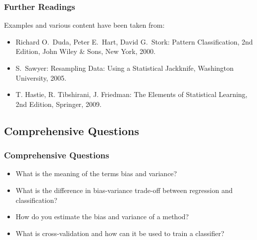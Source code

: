 \begin{frame}
  \frametitle{Further Readings}
  
  Examples and various content have been taken from: \\[.3cm]
  
  \begin{itemize}
    \item Richard O.\ Duda, Peter E.\ Hart, David G.\ Stork: Pattern Classification, 2nd Edition, John Wiley \& Sons, New York, 2000. \\[.3cm]
    \item S.\ Sawyer: Resampling Data: Using a Statistical Jackknife, Washington University, 2005.
  \end{itemize}
  \spread


  \begin{itemize}
    \item T. Hastie, R. Tibshirani, J. Friedman: The Elements of Statistical Learning, 2nd Edition, Springer, 2009.
  \end{itemize}
\end{frame}


\subsection{Comprehensive Questions}

\begin{frame}
  \frametitle{Comprehensive Questions}
  
  \begin{itemize}
    \item What is the meaning of the terms bias and variance? \\[.5cm]
    \item What is the difference in bias-variance trade-off between regression and classification? \\[.5cm]
    \item How do you estimate the bias and variance of a method? \\[.5cm]
    \item What is cross-validation and how can it be used to train a classifier?
  \end{itemize}
\end{frame}

